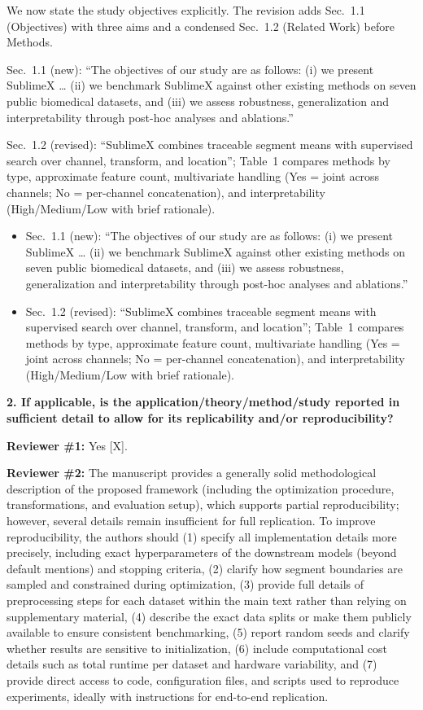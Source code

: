 \documentclass[11pt]{article}
\makeatletter
\newcommand{\rsp}{\par\vspace{0.9em}}
\newcommand{\rcbothq}[3]{%
  \begin{reviewerbox}\textbf{#1}\par\smallskip\textbf{Reviewer \#1:} #2\par\smallskip%
  \textbf{Reviewer \#2:} #3\end{reviewerbox}}
\newcommand{\response}[2]{%
  \begin{responsebox}#1%
  \def\@responseitems{#2}%
  \ifx\@responseitems\empty\else\begin{itemize}[nosep,leftmargin=1.2em]#2\end{itemize}\fi
  \end{responsebox}\rsp}
\makeatother
\begin{document}
\response{We now state the study objectives explicitly. The revision adds Sec.~1.1
(Objectives) with three aims and a condensed Sec.~1.2 (Related Work) before Methods.}{
  \item Sec.~1.1 (new): ``The objectives of our study are as follows: (i) we present SublimeX \ldots{}
    (ii) we benchmark SublimeX against other existing methods on seven public biomedical datasets,
    and (iii) we assess robustness, generalization and interpretability through post-hoc analyses
    and ablations.''
  \item Sec.~1.2 (revised): ``SublimeX combines traceable segment means with supervised search over
    channel, transform, and location''; Table~1 compares methods by type, approximate feature count,
    multivariate handling (Yes = joint across channels; No = per-channel concatenation), and
    interpretability (High/Medium/Low with brief rationale).
}

\rcbothq{2. If applicable, is the application/theory/method/study reported in sufficient detail
to allow for its replicability and/or reproducibility?}{Yes [X].}
{The manuscript provides a generally solid methodological description of the proposed framework
(including the optimization procedure, transformations, and evaluation setup), which supports
partial reproducibility; however, several details remain insufficient for full replication.
To improve reproducibility, the authors should (1) specify all implementation details more
precisely, including exact hyperparameters of the downstream models (beyond default mentions) and
stopping criteria, (2) clarify how segment boundaries are sampled and constrained during
optimization, (3) provide full details of preprocessing steps for each dataset within the main
text rather than relying on supplementary material, (4) describe the exact data splits or make
them publicly available to ensure consistent benchmarking, (5) report random seeds and clarify
whether results are sensitive to initialization, (6) include computational cost details such as
total runtime per dataset and hardware variability, and (7) provide direct access to code,
configuration files, and scripts used to reproduce experiments, ideally with instructions for
end-to-end replication.}
\end{document}
